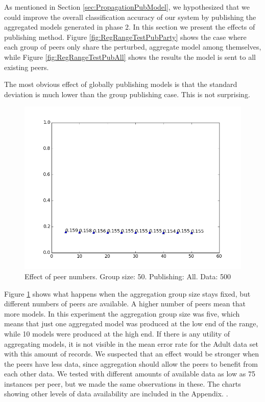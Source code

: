 As mentioned in Section \ref{sec:PropagationPubModel}, we hypothesized that we could improve the overall classification accuracy of our system by publishing the aggregated models generated in phase 2. In this section we present the effects of publishing method. Figure \ref{fig:RegRangeTestPubParty} shows the case where each group of peers only share the perturbed, aggregate model among themselves, while Figure \ref{fig:RegRangeTestPubAll} shows the results the model is sent to all existing peers. 

The most obvious effect of globally publishing models is that the standard deviation is much lower than the group publishing case. This is not surprising.

\begin{figure}[H]
	\centering
	\includegraphics[width=\textwidth]{fig/adult/eps1.0,budg=eps,peers5-55,groups5,reg2e2-data500-pubAll-adult-groupbypeerverification-3-testsetmean}
	\caption{Effect of peer numbers. Group size: 50. Publishing: All. Data: 500}
	\label{fig:peer_range_constant_group}
\end{figure}

Figure \ref{fig:peer_range_constant_group} shows what happens when the aggregation group size stays fixed, but different numbers of peers are available. A higher number of peers mean that more models. In this experiment the aggregation group size was five, which means that just one aggregated model was produced at the low end of the range, while 10 models were produced at the high end. If there is any utility of aggregating models, it is not visible in the mean error rate for the Adult data set with this amount of records. We suspected that an effect would be stronger when the peers have less data, since aggregation should allow the peers to benefit from each other data. We tested with different amounts of available data as low as 75 instances per peer, but we made the same observations in these. The charts showing other levels of data availability are included in the Appendix.  .

